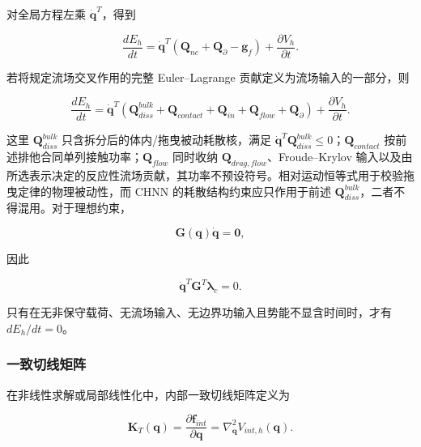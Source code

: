 对全局方程左乘 \({\dot{\mathbf{q}}}^{T}\)，得到

\begin{equation}
\label{eq:galerkin-2-103}
\frac{dE_{h}}{dt} = {\dot{\mathbf{q}}}^{T}\left( \mathbf{Q}_{nc} + \mathbf{Q}_{\partial} - \mathbf{g}_{f} \right) + \frac{\partial V_{h}}{\partial t}.
\end{equation}

若将规定流场交叉作用的完整 Euler--Lagrange 贡献定义为流场输入的一部分，则

\begin{equation}
\label{eq:galerkin-2-104}
\boxed{\frac{dE_{h}}{dt} = {\dot{\mathbf{q}}}^{T}\left( \mathbf{Q}_{diss}^{bulk} + \mathbf{Q}_{contact} + \mathbf{Q}_{in} + \mathbf{Q}_{flow} + \mathbf{Q}_{\partial} \right) + \frac{\partial V_{h}}{\partial t}.}
\end{equation}

这里 \(\mathbf{Q}_{diss}^{bulk}\) 只含拆分后的体内/拖曳被动耗散核，满足 \({\dot{\mathbf{q}}}^{T}\mathbf{Q}_{diss}^{bulk} \leq 0\)；\(\mathbf{Q}_{contact}\) 按前述排他合同单列接触功率；\(\mathbf{Q}_{flow}\) 同时收纳 \(\mathbf{Q}_{drag,flow}\)、Froude--Krylov 输入以及由所选表示决定的反应性流场贡献，其功率不预设符号。相对运动恒等式用于校验拖曳定律的物理被动性，而 CHNN 的耗散结构约束应只作用于前述 \(\mathbf{Q}_{diss}^{bulk}\)，二者不得混用。对于理想约束，

\begin{equation}
\label{eq:galerkin-2-105}
\mathbf{G}\left( \mathbf{q} \right)\dot{\mathbf{q}} = \mathbf{0},
\end{equation}

因此

\begin{equation}
\label{eq:galerkin-2-106}
{\dot{\mathbf{q}}}^{T}\mathbf{G}^{T}\bm{\lambda}_{c} = 0.
\end{equation}

只有在无非保守载荷、无流场输入、无边界功输入且势能不显含时间时，才有 \(dE_{h}/dt = 0\)。

\subsubsection{一致切线矩阵}\label{sec:galerkin-2-9-3}

在非线性求解或局部线性化中，内部一致切线矩阵定义为

\begin{equation}
\label{eq:galerkin-2-107}
\mathbf{K}_{T}\left( \mathbf{q} \right) = \frac{\partial\mathbf{f}_{int}}{\partial\mathbf{q}} = \nabla_{\mathbf{q}}^{2}V_{int,h}\left( \mathbf{q} \right).
\end{equation}

